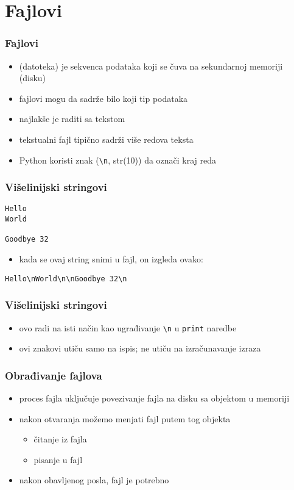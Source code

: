 \documentclass[utf8,compress,aspectratio=169]{beamer}
\begin{document}
\section{Fajlovi}

\begin{frame}[fragile]
  \frametitle{Fajlovi}
  \begin{itemize}
    \item {} (datoteka) je sekvenca podataka koji se čuva na sekundarnoj memoriji (disku)
    \item fajlovi mogu da sadrže bilo koji tip podataka
    \item najlakše je raditi sa tekstom
    \item tekstualni fajl tipično sadrži više redova teksta
    \item Python koristi  znak (\texttt{\textbackslash n}, str(10)) da označi kraj reda
  \end{itemize}
\end{frame}

\begin{frame}[fragile]
  \frametitle{Višelinijski stringovi}
\begin{verbatim}
Hello
World

Goodbye 32
\end{verbatim}
  \begin{itemize}
    \item kada se ovaj string snimi u fajl, on izgleda ovako:
  \end{itemize}
\begin{verbatim}
Hello\nWorld\n\nGoodbye 32\n
\end{verbatim}
\end{frame}

\begin{frame}[fragile]
  \frametitle{Višelinijski stringovi}
  \begin{itemize}
    \item ovo radi na isti način kao ugrađivanje \texttt{\textbackslash n} u \texttt{print} naredbe
    \item ovi znakovi utiču samo na ispis; ne utiču na izračunavanje izraza
  \end{itemize}
\end{frame}

\begin{frame}[fragile]
  \frametitle{Obrađivanje fajlova}
  \begin{itemize}
    \item proces  fajla uključuje povezivanje fajla na disku sa objektom u memoriji
    \item nakon otvaranja možemo menjati fajl putem tog objekta
    \begin{itemize}
      \item čitanje iz fajla
      \item pisanje u fajl
    \end{itemize}
    \item nakon obavljenog posla, fajl je potrebno 
  \end{itemize}
\end{frame}
\end{document}
